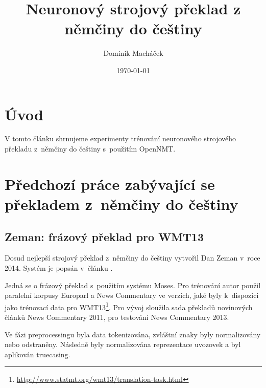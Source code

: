 \documentclass[a4]{article}
\def\furl#1{\footnote{\url{#1}}}
\begin{document}
\title{Neuronový strojový překlad z němčiny do češtiny}

\author{Dominik Macháček}

\date{\today}

\maketitle



\section{Úvod}

V tomto článku shrnujeme experimenty trénování neuronového strojového
překladu z~němčiny do češtiny s~použitím OpenNMT.

\section{Předchozí práce zabývající se překladem z~němčiny do češtiny}

\subsection{Zeman: frázový překlad pro WMT13}

Dosud nejlepší strojový překlad z~němčiny do češtiny vytvořil Dan Zeman
v~roce 2014. Systém je popsán v~článku \cite{zeman}.

Jedná se o frázový překlad s~použitím systému Moses. Pro trénování autor
použil paralelní korpusy Europarl a News Commentary ve verzích, jaké byly
k~dispozici jako trénovací data pro
WMT13\furl{http://www.statmt.org/wmt13/translation-task.html}. Pro vývoj
sloužila sada překladů novinových článků News Commentary 2011, pro testování
News Commentary 2013.

Ve fázi preprocessingu byla data tokenizována, zvláštní znaky byly
normalizovány nebo odstraněny. Následně byly normalizována reprezentace
uvozovek a byl aplikován truecasing.

%
\end{document}
